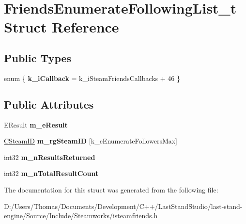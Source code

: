 \hypertarget{structFriendsEnumerateFollowingList__t}{}\section{Friends\+Enumerate\+Following\+List\+\_\+t Struct Reference}
\label{structFriendsEnumerateFollowingList__t}
\subsection*{Public Types}
\begin{DoxyCompactItemize}
\item 
\hypertarget{structFriendsEnumerateFollowingList__t_a1efcc91b3200e38f30d4d753879b7ec6}{}enum \{ {\bfseries k\+\_\+i\+Callback} = k\+\_\+i\+Steam\+Friends\+Callbacks + 46
 \}\label{structFriendsEnumerateFollowingList__t_a1efcc91b3200e38f30d4d753879b7ec6}

\end{DoxyCompactItemize}
\subsection*{Public Attributes}
\begin{DoxyCompactItemize}
\item 
\hypertarget{structFriendsEnumerateFollowingList__t_a529957e33bb31fd508ce5fd3ed955e9a}{}E\+Result {\bfseries m\+\_\+e\+Result}\label{structFriendsEnumerateFollowingList__t_a529957e33bb31fd508ce5fd3ed955e9a}

\item 
\hypertarget{structFriendsEnumerateFollowingList__t_af69b5b6d149ef4c71562ba5c3c5004a8}{}\hyperlink{classCSteamID}{C\+Steam\+I\+D} {\bfseries m\+\_\+rg\+Steam\+I\+D} \mbox{[}k\+\_\+c\+Enumerate\+Followers\+Max\mbox{]}\label{structFriendsEnumerateFollowingList__t_af69b5b6d149ef4c71562ba5c3c5004a8}

\item 
\hypertarget{structFriendsEnumerateFollowingList__t_a4f0a8f33bfa75a6e361b36a2d49a660f}{}int32 {\bfseries m\+\_\+n\+Results\+Returned}\label{structFriendsEnumerateFollowingList__t_a4f0a8f33bfa75a6e361b36a2d49a660f}

\item 
\hypertarget{structFriendsEnumerateFollowingList__t_a41b7d6f82db0f3529670bed5a50e4b80}{}int32 {\bfseries m\+\_\+n\+Total\+Result\+Count}\label{structFriendsEnumerateFollowingList__t_a41b7d6f82db0f3529670bed5a50e4b80}

\end{DoxyCompactItemize}


The documentation for this struct was generated from the following file\+:\begin{DoxyCompactItemize}
\item 
D\+:/\+Users/\+Thomas/\+Documents/\+Development/\+C++/\+Last\+Stand\+Studio/last-\/stand-\/engine/\+Source/\+Include/\+Steamworks/isteamfriends.\+h\end{DoxyCompactItemize}
